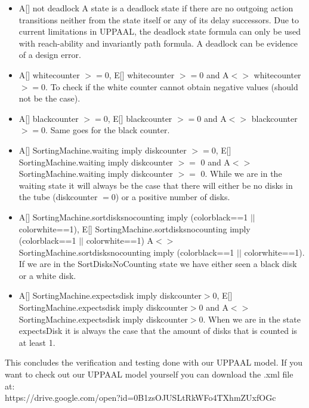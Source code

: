 \begin{itemize}
\item A[] not deadlock  A state is a deadlock state if
there are no outgoing action transitions neither from the state itself or any of its delay successors. Due to current limitations in UPPAAL, the deadlock state formula can only be used with reach-ability and invariantly path formula. A deadlock can be evidence of a design error. 
\item A[] whitecounter  $>= 0$, E[] whitecounter  $>= 0$ and A$<>$ whitecounter  $>= 0$. To check if the white counter cannot obtain negative values (should not be the case).
\item A[] blackcounter  $>= 0$, E[] blackcounter  $>= 0$ and A$<>$ blackcounter  $>= 0$. Same goes for the black counter.
\item A[] SortingMachine.waiting imply diskcounter $>= 0$, E[] SortingMachine.waiting imply diskcounter $>=$ 0 and A$<>$ SortingMachine.waiting imply diskcounter $>=$ 0. While we are in the waiting state it will always be the case that there will either be no disks in the tube (diskcounter $= $0) or a positive number of disks.
\item A[] SortingMachine.sortdisksnocounting imply (colorblack==1 $||$ colorwhite==1), E[] SortingMachine.sortdisksnocounting imply (colorblack==1 $||$ colorwhite==1)
A$<>$ SortingMachine.sortdisksnocounting imply (colorblack==1 $| |$ colorwhite==1). If we are in the SortDisksNoCounting state we have either seen a black disk or a white disk.
\item A[] SortingMachine.expectsdisk imply diskcounter$>0$, 
E[] SortingMachine.expectsdisk imply diskcounter$>0$ and 
A$<>$ SortingMachine.expectsdisk imply diskcounter$>0$. When we are in the state expectsDisk it is always the case that the amount of disks that is counted is at least 1.
\end{itemize}

This concludes the  verification and testing done with our UPPAAL model. If you want to check out our UPPAAL model yourself you can download the .xml file at:\\ 

https://drive.google.com/open?id=0B1zsOJUSLtRkWFo4TXhmZUxfOGc
